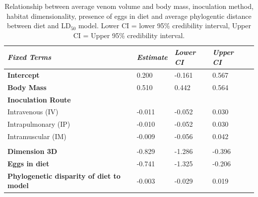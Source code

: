 \begin{table}[H]
  \centering
    \caption[ ]{Relationship between average venom volume and body mass, inoculation method, habitat dimensionality, presence of eggs in diet and average phylogentic distance between diet and LD$_{50}$ model. Lower CI = lower 95\% credibility interval, Upper CI = Upper 95\% credibility interval.}
\begin{tabular}{*5l}    \toprule
\emph{Fixed Terms} & \emph{Estimate} & \emph{Lower CI} & \emph{Upper CI}\\\midrule
\textbf{Intercept} & 0.200  &  -0.161 & 0.567 \\ 
\textbf{Body Mass} & 0.510  & 0.442 & 0.564 \\ 
\textbf{Inoculation Route} &  &  &  \\ 
 Intravenous (IV) &  -0.011 &  -0.052 & 0.030 \\
 Intrapulmonary (IP) &  -0.010 &  -0.052 & 0.030 \\ 
 Intramuscular (IM) &  -0.009 &  -0.056 & 0.042 \\
  &  &  &  \\ 
\textbf{Dimension 3D} &  -0.829 &  -1.286 &  -0.396 \\ 
\textbf{Eggs in diet} &  -0.741 &  -1.325 &  -0.206 \\ 
\textbf{Phylogenetic disparity of diet to model} &  -0.003 &  -0.029 & 0.019 \\\bottomrule
 \hline
\end{tabular}
  \label{tbl:Table 4.2.}
\end{table}



